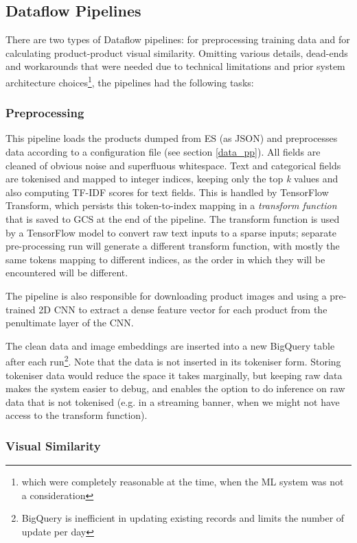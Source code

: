 \subsection{Dataflow Pipelines}
There are two types of Dataflow pipelines: for preprocessing training data and for calculating product-product visual similarity. Omitting various details, dead-ends and workarounds that were needed due to technical limitations and prior system architecture choices\footnote{which were completely reasonable at the time, when the ML system was not a consideration}, the pipelines had the following tasks:

\subsubsection{Preprocessing}

This pipeline loads the products dumped from ES (as JSON) and preprocesses data according to a configuration file (see section \ref{data_pp}).
All fields are cleaned of obvious noise and superfluous whitespace.
Text and categorical fields are tokenised and mapped to integer indices, keeping only the top \textit{k} values and also computing TF-IDF scores for text fields.
This is handled by TensorFlow Transform, which persists this token-to-index mapping in a \textit{transform function} that is saved to GCS at the end of the pipeline.
The transform function is used by a TensorFlow model to convert raw text inputs to a  sparse inputs;
separate pre-processing run will generate a different transform function, with mostly the same tokens mapping to different indices, as the order in which they will be encountered will be different.

The pipeline is also responsible for downloading product images and using a pre-trained 2D CNN to extract a dense feature vector for each product from the penultimate layer of the CNN.

The clean data and image embeddings  are inserted into a new BigQuery table after each run\footnote{BigQuery is inefficient in updating existing records and limits the number of update per day}.
Note that the data is not inserted in its tokeniser form.
Storing tokeniser data would reduce the space it takes marginally, but keeping raw data makes the system easier to debug, and enables the option to do inference on raw data that is not tokenised (e.g. in a streaming banner, when we might not have access to the transform function).

\subsubsection{Visual Similarity}


